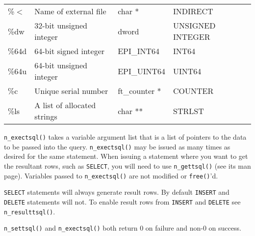 \begin{table}{\label{tab:efmtcodes}}
\begin{tabular}{|l|l|l|l|}
\%$<$         & Name of external file           & char *        & INDIRECT          \\
\%dw          & 32-bit unsigned integer         & dword         & UNSIGNED INTEGER  \\
\%64d         & 64-bit signed integer           & EPI\_INT64    & INT64             \\
\%64u         & 64-bit unsigned integer         & EPI\_UINT64   & UINT64            \\
\%c           & Unique serial number            & ft\_counter * & COUNTER           \\
\%ls          & A list of allocated strings     & char **       & STRLST            \\ \hline
\end{tabular}
\end{table}

\verb`n_exectsql()` takes a variable argument list that is a list of
pointers to the data to be passed into the query.  \verb`n_exectsql()`
may be issued as many times as desired for the same statement.  When
issuing a statement where you want to get the resultant rows, such as
\verb`SELECT`, you will need to use \verb`n_gettsql()` (see its man page).
Variables passed to \verb`n_exectsql()` are not modified or \verb`free()`'d.

\verb`SELECT` statements will always generate result rows.  By default \verb`INSERT`
and \verb`DELETE` statements will not.  To enable result rows from \verb`INSERT` and
\verb`DELETE` see \verb`n_resulttsql()`.

\verb`n_settsql()` and \verb`n_exectsql()` both return 0 on failure and
non-0 on success.

